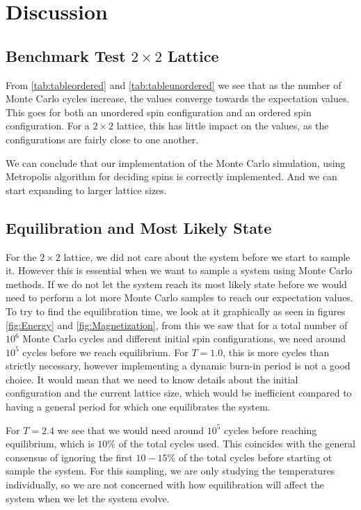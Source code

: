 \documentclass[%
reprint,
nofootinbib,
amsmath,amssymb,
aps,
]{revtex4-1}
\begin{document}
\section{Discussion} %
\subsection{Benchmark Test $2\times 2$ Lattice} %
From \autoref{tab:tableordered} and \autoref{tab:tableunordered} we see that as the number of Monte Carlo cycles increase, the values converge towards the expectation values. This goes for both an unordered spin configuration and an ordered spin configuration. For a $2\times 2$ lattice, this has little impact on the values, as the configurations are fairly close to one another. 

We can conclude that our implementation of the Monte Carlo simulation, using Metropolis algorithm for deciding spins is correctly implemented. And we can start expanding to larger lattice sizes.

\subsection{Equilibration and Most Likely State} %
For the $2\times 2$ lattice, we did not care about the system before we start to sample it. However this is essential when we want to sample a system using Monte Carlo methods. If we do not let the system reach its most likely state before we would need to perform a lot more Monte Carlo samples to reach our expectation values. To try to find the equilibration time, we look at it graphically as seen in figures \ref{fig:Energy} and \ref{fig:Magnetization}, from this we saw that for a total number of $10^6$ Monte Carlo cycles and different initial spin configurations, we need around $10^5$ cycles before we reach equilibrium. For $T=1.0$, this is more cycles than strictly necessary, however implementing a dynamic burn-in period is not a good choice. It would mean that we need to know details about the initial configuration and the current lattice size, which would be inefficient compared to having a general period for which one equilibrates the system. 

For $T=2.4$ we see that we would need around $10^5$ cycles before reaching equilibrium, which is $10\%$ of the total cycles used. This coincides with the general consensus of ignoring the first $10-15\%$ of the total cycles before starting ot sample the system. For this sampling, we are only studying the temperatures individually, so we are not concerned with how equilibration will affect the system when we let the system evolve. 
\end{document}
